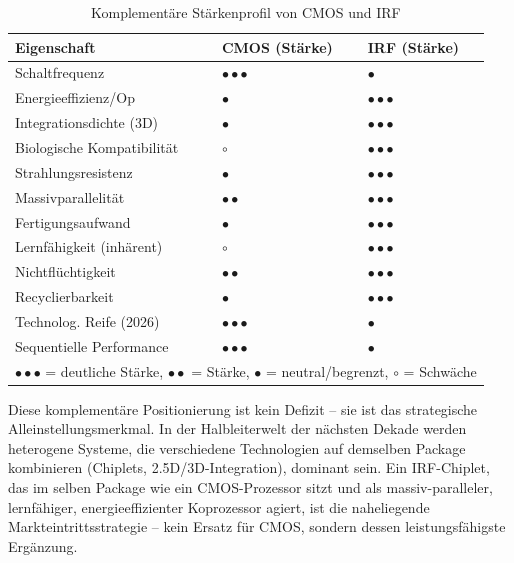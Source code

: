 ﻿\documentclass[a4paper,12pt]{scrreprt}
\theoremstyle{definition}
\begin{document}
\begin{table}[H]
	\centering
	\caption{Komplementäre Stärkenprofil von CMOS und IRF}
	\label{tab:abschluss_vergleich}
	\begin{tabular}{p{5.5cm}p{4cm}p{4cm}}
		\toprule
		\textbf{Eigenschaft} & \textbf{CMOS (Stärke)} & \textbf{IRF (Stärke)} \\
		\midrule
		Schaltfrequenz              & $\bullet\bullet\bullet$ & $\bullet$ \\
		Energieeffizienz/Op         & $\bullet$               & $\bullet\bullet\bullet$ \\
		Integrationsdichte (3D)     & $\bullet$               & $\bullet\bullet\bullet$ \\
		Biologische Kompatibilität  & $\circ$                 & $\bullet\bullet\bullet$ \\
		Strahlungsresistenz         & $\bullet$               & $\bullet\bullet\bullet$ \\
		Massivparallelität          & $\bullet\bullet$        & $\bullet\bullet\bullet$ \\
		Fertigungsaufwand           & $\bullet$               & $\bullet\bullet\bullet$ \\
		Lernfähigkeit (inhärent)    & $\circ$                 & $\bullet\bullet\bullet$ \\
		Nichtflüchtigkeit           & $\bullet\bullet$        & $\bullet\bullet\bullet$ \\
		Recyclierbarkeit            & $\bullet$               & $\bullet\bullet\bullet$ \\
		Technolog. Reife (2026)     & $\bullet\bullet\bullet$ & $\bullet$ \\
		Sequentielle Performance    & $\bullet\bullet\bullet$ & $\bullet$ \\
		\bottomrule
		\multicolumn{3}{l}{\small $\bullet\bullet\bullet$ = deutliche Stärke, $\bullet\bullet$ = Stärke,
			$\bullet$ = neutral/begrenzt, $\circ$ = Schwäche}
	\end{tabular}
\end{table}

Diese komplementäre Positionierung ist kein Defizit -- sie ist das
strategische Alleinstellungsmerkmal. In der Halbleiterwelt der
nächsten Dekade werden heterogene Systeme, die verschiedene
Technologien auf demselben Package kombinieren (Chiplets,
2.5D/3D-Integration), dominant sein. Ein IRF-Chiplet,
das im selben Package wie ein CMOS-Prozessor sitzt und als
massiv-paralleler, lernfähiger, energieeffizienter Koprozessor agiert,
ist die naheliegende Markteintrittsstrategie -- kein Ersatz
für CMOS, sondern dessen leistungsfähigste Ergänzung.
\end{document}
